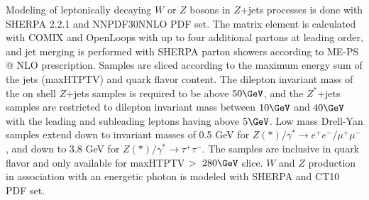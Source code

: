  \iffalse

 \begin{itemize}
 \item Detector simulation done with GEANT4.  GEANT4 models the ATLAS detector geometry, material interactions, and magnetic field potentials. 
 \item Pileup is modeled \textcolor{red}{how is it modeled}  
 \item \textcolor{blue}{Monte Carlo processed by sub-detector specific digitization algorithms, which translate the particle signatures in the detector into raw byte-stream data of the form that comes from the ATLAS detector.  Finally, fully simulated RDOs are reconstructed with release ?? of the ATLAS	 Athena reconstruction software, just like when processing real data.}
 \item \textcolor{red}{Do I want to make a schematic that illustrates the process of producing ATLAS MC simulation?}
 \end{itemize}
 \fi
 
 Modeling of leptonically decaying $W$ or $Z$ bosons in $Z$+jets processes is done with SHERPA 2.2.1 and NNPDF30NNLO PDF set.  The matrix element is calculated with COMIX \cite{comix} and OpenLoops \cite{loop} with up to four additional partons at leading order, and jet merging is performed with SHERPA parton showers according to ME-PS @ NLO prescription.  Samples are sliced according to the maximum energy sum of the jets (maxHTPTV) and quark flavor content.  The dilepton invariant mass of the on shell $Z$+jets samples is required to be above $50\GeV$, and the $Z^*$+jets samples are restricted to dilepton invariant mass between $10\GeV$ and $40\GeV$ with the leading and subleading leptons having \pt above $5\GeV$.  Low mass Drell-Yan samples extend down to invariant masses of 0.5 GeV for $Z{(*)}/\gamma^* \rightarrow e^+e^-/\mu^+\mu^-$, and down to 3.8 GeV for $Z{(*)}/\gamma^* \rightarrow \tau^+\tau^-$.  The samples are inclusive in quark flavor and only available for maxHTPTV $>~280\GeV$ slice.  $W$ and $Z$ production in association with an energetic photon is modeled with SHERPA and CT10 PDF set. %
 
